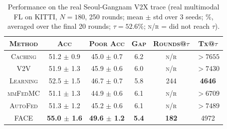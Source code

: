 \begin{table}[t]
    \centering
    \caption{Performance on the real Seoul-Gangnam V2X trace (real multimodal FL on KITTI, $N{=}180$, 250 rounds; mean $\pm$ std over 3 seeds; \%, averaged over the final 20 rounds; $\tau=52.6\%$; \textsc{n/r} = did not reach $\tau$).}
    \label{tab:seoul_results}
    \renewcommand{\arraystretch}{1.15}
    \setlength{\tabcolsep}{4.5pt}
    \begin{tabular}{c|c|c|c|c|c}
        \hline
        \textsc{Method} & \textsc{Acc} & \textsc{Poor Acc} & \textsc{Gap} & \textsc{Rounds@$\tau$} & \textsc{Tx@$\tau$} \\
        \hline
        \textsc{Caching} & 51.2 $\pm$ 0.9 & 45.0 $\pm$ 0.7 & 6.2 & \textsc{n/r} & $>7655$ \\
        \textsc{V2V} & 51.9 $\pm$ 1.3 & 45.9 $\pm$ 0.6 & 6.0 & \textsc{n/r} & $>7430$ \\
        \textsc{Learning} & 52.5 $\pm$ 1.5 & 46.7 $\pm$ 0.7 & 5.8 & 244 & \textbf{4646} \\
        \hline
        \textsc{mmFedMC} & 51.1 $\pm$ 1.3 & 44.9 $\pm$ 0.6 & 6.1 & \textsc{n/r} & $>6709$ \\
        \textsc{AutoFed} & 51.3 $\pm$ 1.2 & 45.2 $\pm$ 0.6 & 6.1 & \textsc{n/r} & $>7489$ \\
        \hline
        \textsc{FACE} & \textbf{55.0 $\pm$ 1.6} & \textbf{49.6 $\pm$ 1.2} & \textbf{5.4} & \textbf{182} & 4972 \\
        \hline
    \end{tabular}
\end{table}
